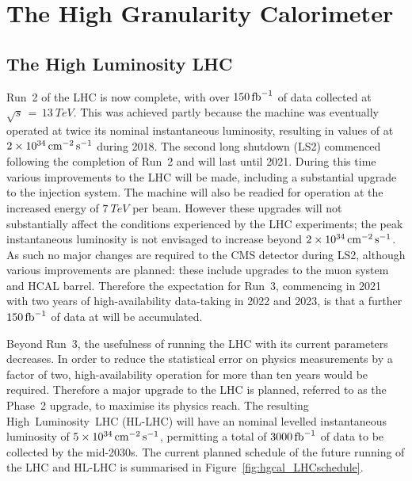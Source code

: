 \chapter{The High Granularity Calorimeter}
\label{chap:hgcal}

\section{The High Luminosity LHC}

Run~2 of the LHC is now complete, with over $\SI{150}{\ensuremath{\textrm{fb}^{-1}}}$ of data collected at $\sqrt{s}\,=\,\SI{13}{TeV}$. %
This was achieved partly because the machine was eventually operated at twice its nominal instantaneous luminosity, resulting in values of at $\SI{2e34}{\ensuremath{\textrm{cm}^{-2}\,\textrm{s}^{-1}}}$ during 2018.
The second long shutdown (LS2) commenced following the completion of Run~2 and will last until 2021.
During this time various improvements to the LHC will be made, including a substantial upgrade to the injection system.
The machine will also be readied for operation at the increased energy of $\SI{7}{TeV}$ per beam.
However these upgrades will not substantially affect the conditions experienced by the LHC experiments; 
the peak instantaneous luminosity is not envisaged to increase beyond $\SI{2e34}{\ensuremath{\textrm{cm}^{-2}\,\textrm{s}^{-1}}}$.
As such no major changes are required to the CMS detector during LS2, although various improvements are planned: 
these include upgrades to the muon system and HCAL barrel.
Therefore the expectation for Run~3, commencing in 2021 with two years of high-availability data-taking in 2022 and 2023, 
is that a further $\SI{150}{\ensuremath{\textrm{fb}^{-1}}}$ of data at will be accumulated. 

Beyond Run~3, the usefulness of running the LHC with its current parameters decreases.
In order to reduce the statistical error on physics measurements by a factor of two, high-availability operation for more than ten years would be required.
Therefore a major upgrade to the LHC is planned, referred to as the Phase~2 upgrade, to maximise its physics reach. 
The resulting High~Luminosity~LHC (HL-LHC) \cite{HLLHC} will have an nominal levelled instantaneous luminosity of $\SI{5e34}{\ensuremath{\textrm{cm}^{-2}\,\textrm{s}^{-1}}}$, 
permitting a total of $\SI{3000}{\ensuremath{\textrm{fb}^{-1}}}$ of data to be collected by the mid-2030s.
The current planned schedule of the future running of the LHC and HL-LHC is summarised in Figure~\ref{fig:hgcal_LHCschedule}.

